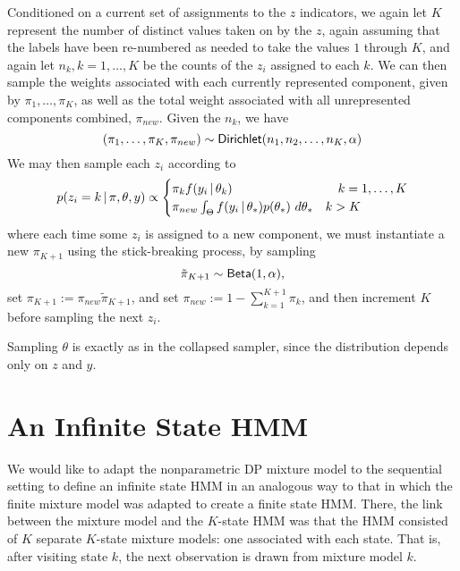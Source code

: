   Conditioned on a current set of
  assignments to the $z$ indicators, we again let $K$ represent the
  number of distinct values taken on by the $z$, again assuming that
  the labels have been re-numbered as needed to take the values $1$
  through $K$, and again let $n_k, k = 1, \dots, K$ be the counts of
  the $z_i$ assigned to each $k$.  
  We can then sample the weights associated with each currently
  represented component, given by $\pi_1, \dots, \pi_K$, as well as
  the total weight associated with all unrepresented components
  combined, $\pi_{new}$.  Given the $n_k$, we have
  \begin{equation}
    \label{eq:2}
    (\pi_1, \dots, \pi_K, \pi_{new}) \sim \mathsf{Dirichlet}(n_1, n_2, \dots, n_K, \alpha)
  \end{equation}
  We may then sample each $z_i$ according to
  \begin{align}
    p(z_i = k \, \vert \, \pi, \theta, y) \propto
    \begin{cases}
      \pi_k f(y_i \, \vert \, \theta_k) & \quad k = 1, \dots, K \\
      \pi_{new} \int_\Theta f(y_i \, \vert \, \theta_*) p(\theta_*)\
      d\theta_* & k > K
    \end{cases}
  \end{align}
  where each time some $z_i$ is assigned to a new component, we must
  instantiate a new $\pi_{K+1}$ using the stick-breaking process, by sampling
  \begin{equation}
    \label{eq:6}
    \tilde{\pi}_{K+1} \sim \mathsf{Beta}(1,\alpha),
  \end{equation}
  set $\pi_{K+1} := \pi_{new} \tilde{\pi}_{K+1}$, and set $\pi_{new}
  := 1 - \sum_{k=1}^{K+1} \pi_k$, and then increment $K$ before
  sampling the next $z_i$.

  Sampling $\theta$ is exactly as in the collapsed sampler, since
  the distribution depends only on $z$ and $y$.

\section{An Infinite State HMM}
\label{sec:an-infinite-state}

We would like to adapt the nonparametric DP mixture model to the
sequential setting to define an infinite state HMM 
in an analogous way to that in which the finite
mixture model was adapted to create a finite state HMM.  There, the
link between the mixture model and the $K$-state HMM was that the HMM
consisted of $K$ separate $K$-state mixture models: one associated
with each state.  That is, after visiting state $k$, the next
observation is drawn from mixture model $k$.

